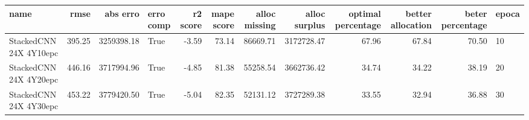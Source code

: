 \begin{tabular}{lrrlrrrrrrrl}
\toprule
name & rmse & abs erro & erro comp & r2 score & mape score & alloc missing & alloc surplus & optimal percentage & better allocation & beter percentage & epoca \\
\midrule
StackedCNN 24X 4Y10epc & 395.25 & 3259398.18 & True & -3.59 & 73.14 & 86669.71 & 3172728.47 & 67.96 & 67.84 & 70.50 & 10 \\
StackedCNN 24X 4Y20epc & 446.16 & 3717994.96 & True & -4.85 & 81.38 & 55258.54 & 3662736.42 & 34.74 & 34.22 & 38.19 & 20 \\
StackedCNN 24X 4Y30epc & 453.22 & 3779420.50 & True & -5.04 & 82.35 & 52131.12 & 3727289.38 & 33.55 & 32.94 & 36.88 & 30 \\
\bottomrule
\end{tabular}
